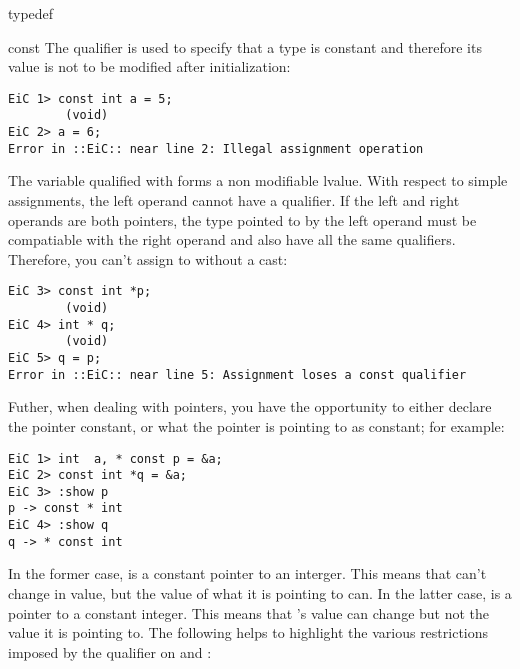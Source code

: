 \small
\begin{Ventry}{typedef}
\item[const]
\label{item:const}
 The  qualifier is used to specify that a
type is constant and therefore its value is not to be modified
after initialization:

\begin{production}
\begin{verbatim}
EiC 1> const int a = 5;
        (void)
EiC 2> a = 6;
Error in ::EiC:: near line 2: Illegal assignment operation
\end{verbatim}
\end{production}

The variable qualified with  forms a non modifiable lvalue.
With respect to simple assignments, the left operand cannot have a
 qualifier. If the left and right operands are both 
pointers, the type pointed to by the left operand must be compatiable
with the right operand and also have all the same qualifiers.
Therefore, you can't assign  to  without a
cast:

\begin{production}
\begin{verbatim}
EiC 3> const int *p;
        (void)
EiC 4> int * q;
        (void)
EiC 5> q = p;
Error in ::EiC:: near line 5: Assignment loses a const qualifier
\end{verbatim}
\end{production}


Futher, when dealing with pointers, you have the opportunity to
either declare the pointer constant, or what the pointer is pointing
to as constant; for example:

\begin{production}
\begin{verbatim}
EiC 1> int  a, * const p = &a;
EiC 2> const int *q = &a;
EiC 3> :show p
p -> const * int 
EiC 4> :show q
q -> * const int 
\end{verbatim}
\end{production}

In the former case,  is a constant pointer to an interger. This
means that  can't change in value, but the value of what it is
pointing to can. In the latter case,  is a pointer to a constant
integer.  This means that 's value can change but not the value
it is pointing to. The following helps to highlight the various
restrictions imposed by the  qualifier on  and :


\end{Ventry}
